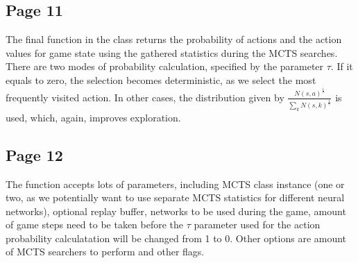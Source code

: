 \subsection{Page 11}
The final function in the class returns the probability of actions and the
action values for game state using the gathered statistics during the MCTS
searches. There are two modes of probability calculation, specified by the
parameter \begin{math}\tau\end{math}. If it equals to zero, the selection becomes deterministic, as we
select the most frequently visited action. In other cases, the distribution
given by
\begin{math}\frac{N(s,a)^\frac{1}{\tau}}{\sum_kN(s,k)^\frac{1}{\tau}}\end{math}
is used, which, again, improves exploration.

\subsection{Page 12}
The function accepts lots of parameters, including MCTS class instance (one or
two, as we potentially want to use separate MCTS statistics for different neural
networks), optional replay buffer, networks to be used during the game, amount
of game steps need to be taken before the \begin{math}\tau\end{math} parameter used for the action
probability calculatation will be changed from 1 to 0. Other options are amount
of MCTS searchers to perform and other flags.



